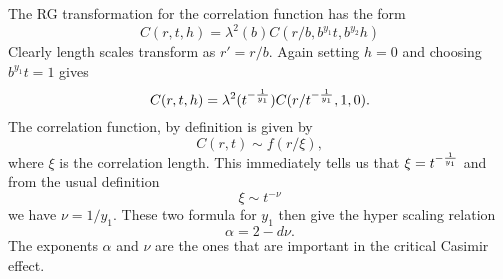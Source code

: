 The RG transformation for the correlation function has the form
\begin{equation}
    C(r,t,h) = \lambda^2(b) C(r/b, b^{y_1}t,  b^{y_2} h)
\end{equation}
Clearly length scales transform as $r' = r/b$. Again setting $h=0$ and choosing $b^{y_1}t=1$ gives
\begin{equation}
    C(r,t,h) = \lambda^2(t^{-{1\over y_1}}) C(r/t^{-{1\over y_1}}, 1, 0).
\end{equation}
The correlation function, by definition is given by
\begin{equation}
    C(r,t) \sim f(r/\xi),
\end{equation}
where $\xi$ is the correlation length. This immediately tells us that $\xi = t^{-{1\over y_1}}$ and from the usual definition 
\begin{equation}
    \xi \sim t^{-\nu}
\end{equation}
we have $\nu = 1/y_1$.  These two formula for $y_1$ then give the hyper scaling relation
\begin{equation}
    \alpha = 2-d\nu.
\end{equation}
The exponents $\alpha$ and $\nu$ are the ones that are important in the critical Casimir effect.

